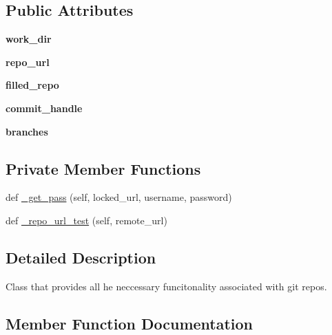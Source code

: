 \subsection*{Public Attributes}
\begin{DoxyCompactItemize}
\item 
\mbox{\label{class_git_repo_1_1_git_repo_ae7a8a45b9f08b56c068815a376cb1f9b}} 
{\bfseries work\+\_\+dir}
\item 
\mbox{\label{class_git_repo_1_1_git_repo_aee93693f29e2713b626b4d408c58fd10}} 
{\bfseries repo\+\_\+url}
\item 
\mbox{\label{class_git_repo_1_1_git_repo_a8d29c7ac45aa2f793bc3644753239a90}} 
{\bfseries filled\+\_\+repo}
\item 
\mbox{\label{class_git_repo_1_1_git_repo_a87d5dc3760dc2efc744ba6053599013e}} 
{\bfseries commit\+\_\+handle}
\item 
\mbox{\label{class_git_repo_1_1_git_repo_aa038dfda06b6459820b682b1b39c4f73}} 
{\bfseries branches}
\end{DoxyCompactItemize}
\subsection*{Private Member Functions}
\begin{DoxyCompactItemize}
\item 
def \hyperlink{class_git_repo_1_1_git_repo_a9bb8857a25ef5927efe54dc061b37e74}{\+\_\+get\+\_\+pass} (self, locked\+\_\+url, username, password)
\item 
def \hyperlink{class_git_repo_1_1_git_repo_a831b08d2d19131c00aa6bd3eb7f6f9b7}{\+\_\+repo\+\_\+url\+\_\+test} (self, remote\+\_\+url)
\end{DoxyCompactItemize}


\subsection{Detailed Description}
Class that provides all he neccessary funcitonality associated with git repos. 



\subsection{Member Function Documentation}
\mbox{\label{class_git_repo_1_1_git_repo_a9bb8857a25ef5927efe54dc061b37e74}} 
